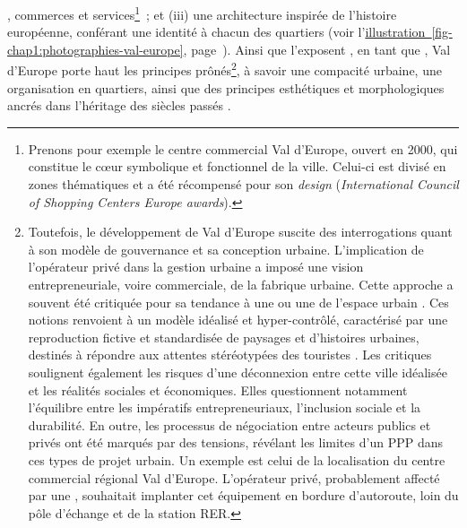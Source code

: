 \begin{refsegment}
{}, commerces et services\footnote{
    Prenons pour exemple le centre commercial Val d'Europe, ouvert en 2000, qui constitue le cœur symbolique et fonctionnel de la ville. Celui-ci est divisé en zones thématiques et a été récompensé pour son \textsl{design} (\textsl{International Council of Shopping Centers Europe awards}).
}~; et (iii) une architecture inspirée de l'histoire européenne, conférant une identité à chacun des quartiers (voir l'\hyperref[fig-chap1:photographies-val-europe]{illustration~\ref{fig-chap1:photographies-val-europe}}, page~\pageref{fig-chap1:photographies-val-europe}). Ainsi que l'exposent \textcolor{blue}{\textcite[25]{dupuis_nouvelle_2017}}, en tant que , Val d'Europe porte haut les principes prônés\footnote{
    Toutefois, le développement de Val d'Europe suscite des interrogations quant à son modèle de gouvernance et sa conception urbaine. L'implication de l'opérateur privé dans la gestion urbaine a imposé une vision entrepreneuriale, voire commerciale, de la fabrique urbaine. Cette approche a souvent été critiquée pour sa tendance à une  ou une  de l'espace urbain \textcolor{blue}{\autocite[]{brunel_planete_2012}}. Ces notions renvoient à un modèle idéalisé et hyper-contrôlé, caractérisé par une reproduction fictive et standardisée de paysages et d'histoires urbaines, destinés à répondre aux attentes stéréotypées des touristes \textcolor{blue}{\autocite[7]{claude_developpement_2021}}. Les critiques soulignent également les risques d'une déconnexion entre cette ville idéalisée et les réalités sociales et économiques. Elles questionnent notamment l'équilibre entre les impératifs entrepreneuriaux, l'inclusion sociale et la durabilité. En outre, les processus de négociation entre acteurs publics et privés ont été marqués par des tensions, révélant les limites d'un \acrshort{PPP} dans ces types de projet urbain. Un exemple est celui de la localisation du centre commercial régional Val d'Europe. L'opérateur privé, probablement affecté par une  \textcolor{blue}{\autocite[656]{tan_identifying_2014}}, souhaitait implanter cet équipement en bordure d'autoroute, loin du pôle d'échange et de la station \acrshort{RER}.
}, à savoir une compacité urbaine, une organisation en quartiers, ainsi que des principes esthétiques et morphologiques ancrés dans l'héritage des siècles passés \textcolor{blue}{\autocite[12]{moinse_exploring_2023}}.%


\end{refsegment}
